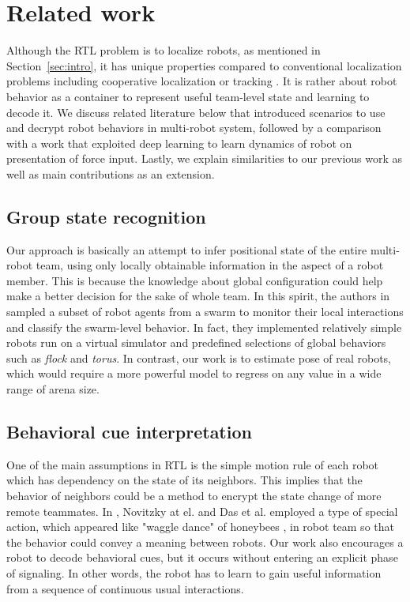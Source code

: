 \documentclass[letterpaper, 10 pt, conference]{ieeeconf}  %
\begin{document}
	\section{Related work}
	\label{sec:related_work}

	Although the RTL problem is to localize robots, as mentioned in
	Section~\ref{sec:intro}, it has unique properties compared to conventional
	localization problems including	cooperative localization or tracking
	\cite{LSRB16, FSDO10, CX14, DMG15}.
	It is rather about robot behavior as a container to
	represent useful team-level state and learning to decode it.
	We discuss related literature below that introduced scenarios to use and decrypt
	robot behaviors in multi-robot system, followed by a comparison with a work
	that exploited deep learning to learn dynamics of robot on presentation
	of force input.
	Lastly, we explain similarities to our previous work as well as main
	contributions as an extension.

	\subsection{Group state recognition}
	\label{sec:group_state_recognition}
	Our approach is basically an attempt to infer positional state of the entire
	multi-robot team, using only locally obtainable information in the aspect of a robot
	member. This is because the knowledge about global configuration could
	help make a better decision for the sake of whole team. In this spirit,
	the authors in \cite{BG14, BSB16} sampled a subset of robot agents from a swarm to
	monitor their local interactions and classify the swarm-level behavior.
	In fact, they implemented relatively simple robots run on a virtual simulator and
	predefined selections of global behaviors such as \emph{flock} and \emph{torus}.
	In contrast, our work is to estimate pose of real robots, which would require a more
	powerful model to regress on any value in a wide range of arena size.

	\subsection{Behavioral cue interpretation}
	\label{sec:behavioral_cue_interpretation}

	One of the main assumptions in RTL is the simple motion rule of each robot which
	has dependency on the state of its neighbors. This implies that the behavior of
	neighbors could be a method to encrypt the state change of more remote teammates.
	In \cite{NPCBW12, DCV16}, Novitzky at el. and Das et al. employed a type of
	special action, which appeared like "waggle dance" of honeybees \cite{VonFrisch67},
	in robot team so that the behavior could convey a meaning between robots.
	Our work also encourages a robot to decode behavioral cues, but it occurs without
	entering an explicit phase of signaling. In other words, the robot has to learn
	to gain useful information from a sequence of continuous usual interactions.
\end{document}
